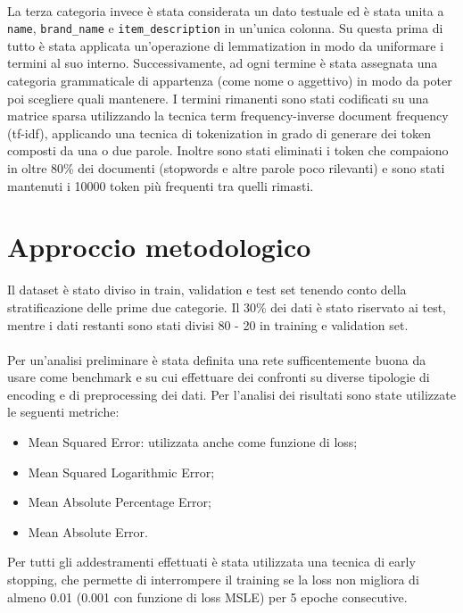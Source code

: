 \paragraph{} La terza categoria invece è stata considerata un dato testuale ed è stata unita a 
{\tt name}, {\tt brand\_name} e {\tt item\_description} in un'unica colonna. Su questa prima 
di tutto è stata applicata un'operazione di lemmatization \cite{lemmatization} in modo da uniformare i termini al 
suo interno. Successivamente, ad ogni termine è stata assegnata una categoria grammaticale di 
appartenza (come nome o aggettivo) in modo da poter poi scegliere quali mantenere. I termini 
rimanenti sono stati codificati su una matrice sparsa utilizzando la tecnica term 
frequency-inverse document frequency (tf-idf), applicando una tecnica di tokenization in grado 
di generare dei token composti da una o due parole. Inoltre sono stati eliminati i token che 
compaiono in oltre 80\% dei documenti (stopwords e altre parole poco rilevanti) e sono stati 
mantenuti i 10000 token più frequenti tra quelli rimasti.

\section{Approccio metodologico}

Il dataset è stato diviso in train, validation e test set tenendo conto della stratificazione delle 
prime due categorie. Il 30\% dei dati è stato riservato ai test, mentre i dati restanti sono stati divisi 
80 - 20 in training e validation set.

\paragraph{}Per un'analisi preliminare è stata definita una rete sufficentemente buona da usare come benchmark e 
su cui effettuare dei confronti su diverse tipologie di encoding e di preprocessing dei dati. 
Per l'analisi dei risultati sono state utilizzate le seguenti metriche:
\begin{itemize}
    \item Mean Squared Error: utilizzata anche come funzione di loss;
    \item Mean Squared Logarithmic Error;
    \item Mean Absolute Percentage Error;
    \item Mean Absolute Error.
\end{itemize}
Per tutti gli addestramenti effettuati è stata utilizzata una tecnica di early stopping, che permette 
di interrompere il training se la loss non migliora di almeno 0.01 (0.001 con funzione di loss MSLE) 
per 5 epoche consecutive.

